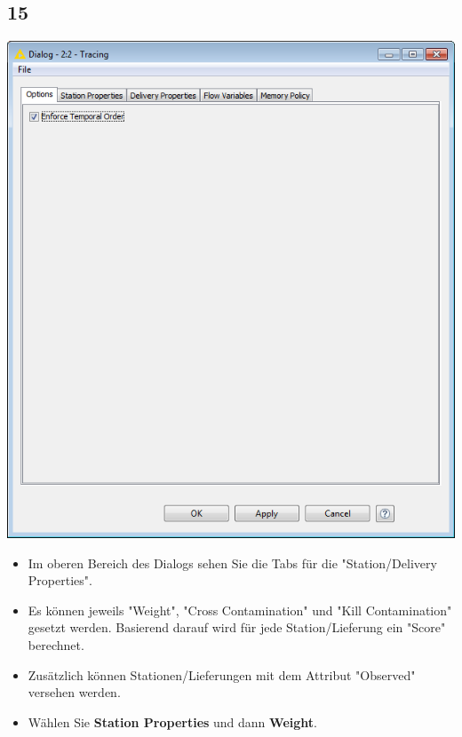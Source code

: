 \documentclass{beamer}
\begin{document}
\subsection{15}
\begin{frame}
	\begin{center}
  		\includegraphics[height=0.5\textheight]{15.png}
	\end{center}
	\begin{itemize}
		\item Im oberen Bereich des Dialogs sehen Sie die Tabs für die "Station/Delivery Properties".
		\item Es können jeweils "Weight", "Cross Contamination" und "Kill Contamination" gesetzt werden. Basierend darauf wird für jede Station/Lieferung ein "Score" berechnet.
		\item Zusätzlich können Stationen/Lieferungen mit dem Attribut "Observed" versehen werden.
		\item Wählen Sie \textbf{Station Properties} und dann \textbf{Weight}.
	\end{itemize}
\end{frame}
\end{document}
